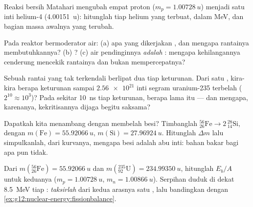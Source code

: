 \begin{exercise}[$\star\star$]\label{exo:g12:nuclear-energy:10}
Reaksi bersih Matahari mengubah empat proton ($m_p = \qty{1.00728}{u}$) menjadi satu
inti helium-4 (\qty{4.00151}{u}): hitunglah  tiap helium yang terbuat, dalam
\unit{MeV}, dan bagian massa awalnya yang terubah.
\end{exercise}

\begin{exercise}[$\star\star$]\label{exo:g12:nuclear-energy:11}
Pada reaktor bermoderator air: (a) apa yang dikerjakan , dan mengapa
rantainya membutuhkannya? (b) ? (c) air pendinginnya \emph{adalah}
: mengapa kehilangannya cenderung mencekik rantainya dan bukan mempercepatnya?
\end{exercise}

\begin{exercise}[$\star\star\star$]\label{exo:g12:nuclear-energy:12}
Sebuah rantai yang tak terkendali berlipat dua tiap keturunan. Dari satu , kira-kira berapa
keturunan sampai $\num{2.56e21}$ inti segram uranium-235
terbelah ($2^{10} \approx 10^{3}$)? Pada sekitar \qty{10}{ns} tiap keturunan,
berapa lama itu --- dan mengapa, karenanya, kekritisannya dijaga begitu saksama?
\end{exercise}

\begin{exercise}[$\star\star\star$]\label{exo:g12:nuclear-energy:13}
Dapatkah kita menambang  dengan membelah besi? Timbanglah
${}^{56}_{26}\mathrm{Fe} \to 2\,{}^{28}_{14}\mathrm{Si}$, dengan
$m(\mathrm{Fe}) = \qty{55.92066}{u}$, $m(\mathrm{Si}) = \qty{27.96924}{u}$.
Hitunglah $\Delta m$ lalu simpulkanlah, dari kurvanya, mengapa besi adalah
abu inti: bahan bakar bagi apa pun tidak.
\end{exercise}

\begin{exercise}[$\star\star\star$]\label{exo:g12:nuclear-energy:14}
Dari $m({}^{56}_{26}\mathrm{Fe}) = \qty{55.92066}{u}$ dan
$m({}^{235}_{92}\mathrm{U}) = \qty{234.99350}{u}$, hitunglah $E_b/A$ untuk keduanya
($m_p = \qty{1.00728}{u}$, $m_n = \qty{1.00866}{u}$). Serpihan  duduk
di dekat \qty{8.5}{MeV} tiap : \emph{taksirlah} dari kedua arasnya 
satu , lalu bandingkan dengan \cref{ex:g12:nuclear-energy:fissionbalance}.
\end{exercise}

